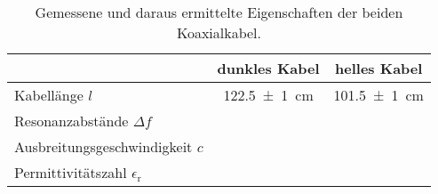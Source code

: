 	\begin{table}[H]
		\centering
		\caption{Gemessene und daraus ermittelte Eigenschaften der beiden Koaxialkabel.} 
		\label{tab:kabel}
		\begin{tabular}{l|c|c}
			                                       &           dunkles Kabel           &          helles Kabel           \\ \hline
			Kabellänge $l$                         &   \SI{122,5 +- 1}{\centi\meter}   &  \SI{101,5 +- 1}{\centi\meter}  \\
			Resonanzabstände $\Delta f$            &  &  \\
			Ausbreitungsgeschwindigkeit $c$        &         &         \\
			Permittivitätszahl $\epsilon_\text{r}$ &           &     
		\end{tabular}
	\end{table}
	